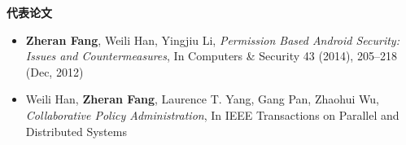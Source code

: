 \documentclass[letterpaper,10pt]{article}
\newcommand{\resheading}[1]{{\large \colorbox{mygrey}{\begin{minipage}{\textwidth}{\textbf{#1 \vphantom{p\^{E}}}}\end{minipage}}}}
\begin{document}







	





\resheading{代表论文}
\begin{itemize}
 \item
 \textbf{Zheran Fang}, Weili Han, Yingjiu Li, \emph{Permission Based Android Security: Issues and Countermeasures}, In Computers \& Security 43 (2014), 205–218 (Dec, 2012)

 \item
 Weili Han, \textbf{Zheran Fang}, Laurence T. Yang, Gang Pan, Zhaohui Wu, \emph{Collaborative Policy Administration}, In IEEE Transactions on Parallel and Distributed Systems
\end{itemize}
\end{document}
